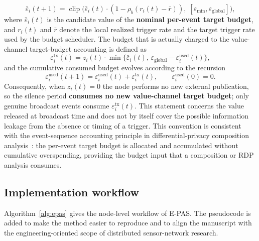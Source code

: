 \documentclass[10pt]{article}
\newcommand{\EPAS}{E-PAS}
\newcommand{\egl}{\varepsilon_{\text{global}}}
\DeclareMathOperator{\clip}{clip}
\begin{document}
\begin{equation}\label{eq:budget_update}
  \bar{\varepsilon}_i(t+1) = \clip\!\bigl(\bar{\varepsilon}_i(t)\cdot(1-\rho_b(r_i(t)-\bar{r})),\;[\varepsilon_{\min},\egl]\bigr),
\end{equation}
where $\bar{\varepsilon}_i(t)$ is the candidate value of the \textbf{nominal per-event target budget}, and $r_i(t)$ and $\bar r$ denote the local realized trigger rate and the target trigger rate used by the budget scheduler. The budget that is actually charged to the value-channel target-budget accounting is defined as
\begin{equation}\label{eq:eps_tx}
  \varepsilon_i^{\mathrm{tx}}(t) = z_i(t)\cdot\min\!\bigl\{\bar{\varepsilon}_i(t),\, \egl-\varepsilon_i^{\mathrm{used}}(t)\bigr\},
\end{equation}
and the cumulative consumed budget evolves according to the recursion
\begin{equation}
  \varepsilon_i^{\mathrm{used}}(t+1) = \varepsilon_i^{\mathrm{used}}(t) + \varepsilon_i^{\mathrm{tx}}(t),\qquad \varepsilon_i^{\mathrm{used}}(0)=0.
\end{equation}
Consequently, when $z_i(t)=0$ the node performs no new external publication, so the silence period \textbf{consumes no new value-channel target budget}; only genuine broadcast events consume $\varepsilon_i^{\mathrm{tx}}(t)$. This statement concerns the value released at broadcast time and does not by itself cover the possible information leakage from the absence or timing of a trigger.
This convention is consistent with the event-sequence accounting principle in differential-privacy composition analysis~\cite{kairouz2017,mironov2017}: the per-event target budget is allocated and accumulated without cumulative overspending, providing the budget input that a composition or RDP analysis consumes.


\subsection{Implementation workflow}

Algorithm~\ref{alg:epas} gives the node-level workflow of \EPAS{}. The pseudocode is added to make the method easier to reproduce and to align the manuscript with the engineering-oriented scope of distributed sensor-network research.
\end{document}
